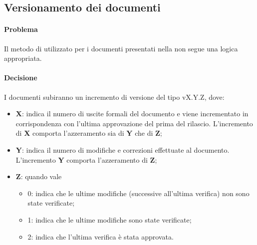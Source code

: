 \subsection{Versionamento dei documenti}
\paragraph{Problema} Il metodo di  utilizzato per i documenti presentati nella \RR non segue una logica appropriata.
\paragraph{Decisione} I documenti subiranno un incremento di versione del tipo vX.Y.Z, dove:
\begin{itemize}
\item \textbf{X}: indica il numero di uscite formali del documento e viene incrementato in corrispondenza con l'ultima approvazione del \rRP prima del rilascio. L'incremento di \textbf{X} comporta l'azzeramento sia di \textbf{Y} che di \textbf{Z};
\item \textbf{Y}: indica il numero di modifiche e correzioni effettuate al documento. L'incremento \textbf{Y} comporta l'azzeramento di \textbf{Z};
\item \textbf{\textbf{Z}}: quando vale\begin{itemize}[label=]
\item 0: indica che le ultime modifiche (successive all'ultima verifica) non sono state verificate;
\item 1: indica che le ultime modifiche sono state verificate;
\item 2: indica che l'ultima verifica è stata approvata.
\end{itemize}
\end{itemize}

